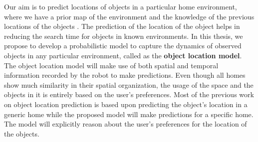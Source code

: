 \specialhead{\abstractname}

Our aim is to predict locations of objects in
a particular home environment, where we have a prior map of the
environment and the knowledge of the previous locations of the objects . The prediction of the location of the object helps in
reducing the search time for objects in known environments.
 In this thesis, we propose to develop a
probabilistic model to capture the dynamics of observed objects in any
particular environment, called as the \textbf{object location model}.
The object location model will make use of both spatial and temporal information
recorded by the robot to make predictions.
Even though all homes show much similarity in
their spatial organization, the usage of the space and the objects in it is
entirely based on the user's preferences. Most of the previous work on object location prediction is based upon predicting the object's location in a generic home while the proposed model will make predictions for a specific home. The model will
explicitly reason about the user's preferences for the location of the objects.

